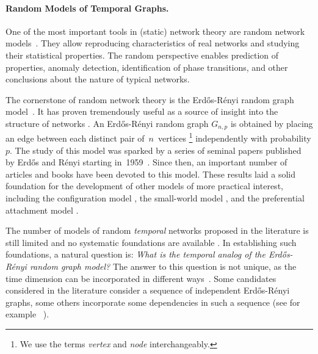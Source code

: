 \documentclass[a4paper,11pt]{article}
\theoremstyle{definition}
\theoremstyle{plain}
\newcommand{\Erdos}{Erd\H{o}s}
\newcommand{\Renyi}{R\'enyi}
\newcommand{\ER}{\Erdos-\Renyi}
\begin{document}
\paragraph*{Random Models of Temporal Graphs.}
One of the most important tools in (static) network theory are random network models~\cite{newman2003structure}.
They allow reproducing characteristics of real networks and studying their statistical properties.
The random perspective enables prediction of properties, anomaly detection, identification of phase transitions, and other conclusions about the nature of typical networks. %

The cornerstone of random network theory is the \ER{} random graph model~\cite{NetworkScience}.
It has proven tremen\-dously useful as a source of insight into the structure of networks \cite{newman2018networks}.
An \ER{} random graph $G_{n,p}$ is obtained by placing an edge between each distinct pair
of~$n$~vertices%
\footnote{We use the terms \emph{vertex} and \emph{node} interchangeably.}
independently with probability $p$.
The study of this model was sparked by a series of seminal papers published by Erd\H{o}s and R\'{e}nyi starting in~1959~\cite{erdHos1959random, ER60-evolution, erdHos1961strength, erdHos1966existence}.
Since then, an important number of articles and books have been devoted to this model.
These results laid a solid foundation for the development of other models of more practical interest, including
the configuration model \cite{molloy1995critical, molloy1998size, newman2001random},
the small-world model \cite{watts1998collective}, and
the preferential attachment model \cite{barabasi1999emergence}.

The number of models of random \emph{temporal} networks proposed in the literature is still limited and
no systematic foundations are available \cite{holme2012temporal}.
In establishing such foundations, a natural question is: 
\emph{What is the temporal analog of the \ER{} random graph model?}
The answer to this question is not unique, as the time dimension can be incorporated 
in different ways~\cite{newman2018networks}.
Some candidates considered in the literature consider a sequence of independent \ER{} graphs, some others incorporate some dependencies in such a sequence (see for example ~\cite{chaintreau2007diameter,clementi2009broadcasting,clementi2010flooding, grindrod2010evolving, baumann2011parsimonious, zhang2017random, akrida2020fast}).
\end{document}
